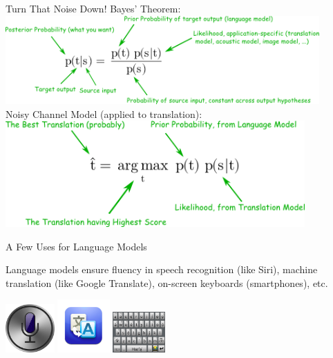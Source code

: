 \documentclass[xcolor=pdftex,x11names,table,hyperref]{beamer}
\begin{document}
\begin{frame}{Turn That Noise Down!}
	Bayes' Theorem: \\[0.5em]
	\includegraphics[width=0.90\textwidth]{images/bayes_theorem.png} \\[1.0em]
	\pause
	Noisy Channel Model (applied to translation): \\[0.5em]
	\includegraphics[width=0.86\textwidth]{images/noisy_channel.png}
\end{frame}


\begin{frame}{A Few Uses for Language Models}
 \begin{block}{}
	 Language models ensure fluency in speech recognition (like Siri), machine translation (like Google Translate), on-screen keyboards (smartphones), etc.
 \end{block}
\begin{center}
	\includegraphics[width=0.14\textwidth]{images/siri.jpg} \hspace{2em}
	\includegraphics[width=0.15\textwidth]{images/google-translate.jpg} \hspace{2em}
	\includegraphics[width=0.15\textwidth]{images/navajo-android-keyboard-crop.png}\\[.1ex]
\end{center}
\end{frame}
\end{document}
